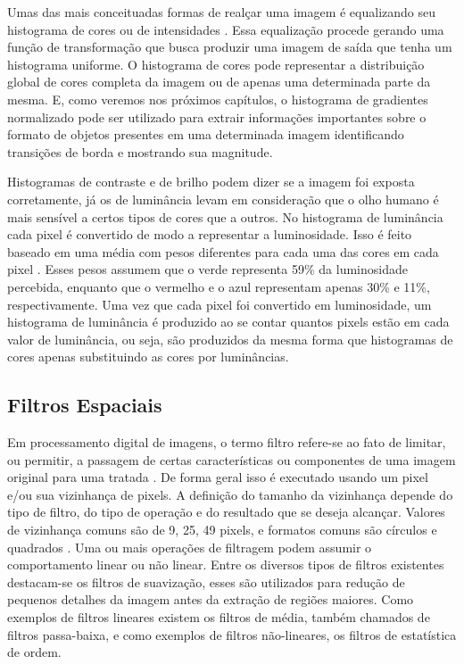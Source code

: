 Umas das mais conceituadas formas de realçar uma imagem é equalizando seu histograma de cores ou de intensidades \cite{Gonzalez}. Essa equalização procede gerando uma função de transformação que busca produzir uma imagem de saída que tenha um histograma uniforme. O histograma de cores pode representar a distribuição global de cores completa da imagem ou de apenas uma determinada parte da mesma.
E, como veremos nos próximos capítulos, o histograma de gradientes normalizado pode ser utilizado para extrair informações importantes sobre o formato de objetos presentes em uma determinada imagem identificando transições de borda e mostrando sua magnitude.

Histogramas de contraste e de brilho podem dizer se a imagem foi exposta corretamente, já os de luminância levam em consideração que o olho humano é mais sensível a certos tipos de cores que a outros. No histograma de luminância cada pixel é convertido de modo a representar a luminosidade. Isso é feito baseado em uma média com pesos diferentes para cada uma das cores em cada pixel \cite{Wand}. Esses pesos assumem que o verde representa 59\% da luminosidade percebida, enquanto que o vermelho e o azul representam apenas 30\% e 11\%, respectivamente. Uma vez que cada pixel foi convertido em luminosidade, um histograma de luminância é produzido ao se contar quantos pixels estão em cada valor de luminância, ou seja, são produzidos da mesma forma que histogramas de cores apenas substituindo as cores por luminâncias.


 
\subsection{Filtros Espaciais}

Em processamento digital de imagens, o termo filtro refere-se ao fato de limitar, ou permitir, a passagem de certas características ou componentes de uma imagem original para uma tratada \cite{Gonzalez}. De forma geral isso é executado usando um pixel e/ou sua vizinhança de pixels. 
A definição do tamanho da vizinhança depende do tipo de filtro, do tipo de operação e do resultado que se deseja alcançar. Valores de vizinhança comuns são de 9, 25, 49 pixels, e formatos comuns são círculos e quadrados \cite{Gonzalez}. Uma ou mais operações de filtragem podem assumir o comportamento linear ou não linear. Entre os diversos tipos de filtros existentes destacam-se os filtros de suavização, esses são utilizados para redução de pequenos detalhes da imagem antes da extração de regiões maiores. Como exemplos de filtros lineares existem os filtros de média, também chamados de filtros passa-baixa, e como exemplos de filtros não-lineares, os filtros de estatística de ordem. 

